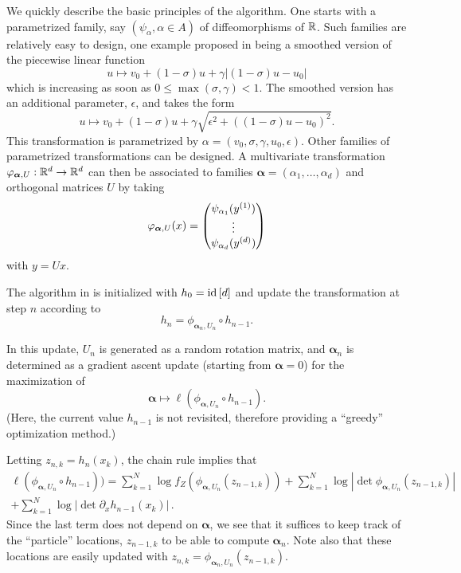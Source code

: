 We quickly describe the basic principles of the algorithm. One starts with a 
parametrized family, say $(\psi_\alpha, \alpha \in A)$ of diffeomorphisms of ${\mathbb{R}}$. Such families are relatively easy to design, one example proposed in \citep{tabak2010density} being a smoothed version of the piecewise linear function
\[
u \mapsto v_0 + (1-\sigma) u + \gamma |(1-\sigma) u - u_0|
\]
which is increasing as soon as $0\leq \max(\sigma, \gamma) < 1$. The smoothed version has an additional parameter, $\epsilon$, and takes the form
\[
u \mapsto v_0 + (1-\sigma) u + \gamma \sqrt{\epsilon^2 + ((1-\sigma) u - u_0)^2}.
\]
This transformation is parametrized by $\alpha = (v_0, \sigma, \gamma, u_0, \epsilon)$. 
Other families of parametrized transformations can be designed. A multivariate transformation $\varphi_{\bm\alpha, U}: {\mathbb{R}}^d\to{\mathbb{R}}^d$ can then be associated to families $\boldsymbol\alpha = (\alpha_1, \ldots, \alpha_d)$ and orthogonal matrices $U$  by taking
\[
\varphi_{\bm\alpha, U}(x) = \begin{pmatrix}
\psi_{\alpha_1}(y^{(1)})\\ \vdots \\ \psi_{\alpha_d}( y^{(d)})
\end{pmatrix}
\]
with $y = Ux$. 


The algorithm in \citep{tabak2010density} is initialized with $h_0 = {\mathrm{id}}\,[d]$ and update the transformation at step $n$ according to 
\[
h_{n} = \phi_{\boldsymbol\alpha_n, U_n}\circ h_{n-1}.
\] 

In this update, $U_n$ is generated as a random rotation matrix, and $\boldsymbol\alpha_n$ is determined as a gradient ascent update (starting from $\boldsymbol\alpha = 0$) for the maximization of 
\[
\boldsymbol\alpha \mapsto \ell(\phi_{\boldsymbol\alpha, U_n}\circ h_{n-1}).
\]
(Here, the current value $h_{n-1}$ is not revisited, therefore providing a ``greedy'' optimization method.)

Letting $z_{n,k} = h_n(x_k)$, the chain rule implies that   
\begin{multline*}
\ell(\phi_{\boldsymbol\alpha, U_n}\circ h_{n-1})) = \sum_{k=1}^N \log f_Z(\phi_{\boldsymbol\alpha, U_n}(z_{n-1,k})) + \sum_{k=1}^N \log |\det{\phi_{\boldsymbol\alpha, U_n}(z_{n-1,k})}| \\+ \sum_{k=1}^N \log |\det{\partial_x h_{n-1}(x_k)}|\,.
\end{multline*}
Since the last term does not depend on $\boldsymbol\alpha$, we see that it suffices to keep track of the ``particle'' locations,  $z_{n-1, k}$ to be able to compute $\boldsymbol\alpha_n$. Note also that these locations are easily updated with
$z_{n, k} = \phi_{\boldsymbol\alpha_n, U_n}(z_{n-1, k})$.


